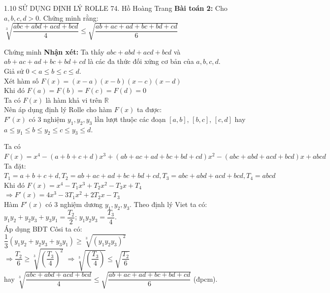 \begin{frame}{{1.10 SỬ DỤNG ĐỊNH LÝ ROLLE \hspace{4cm}  74. Hồ Hoàng Trang}}
	\textbf{Bài toán 2:}
	Cho $a,b,c,d>0$. Chứng minh rằng: \\$\sqrt[3]{\dfrac{abc+abd+acd+bcd}{4}}\le \sqrt{\dfrac{ab+ac+ad+bc+bd+cd}{6}}$\\
	\pause
	\begin{block}{Chứng minh}
    \textbf{Nhận xét:} Ta thấy $abc+abd+acd+bcd$ và $ab+ac+ad+bc+bd+cd$ là các đa thức đối xứng cơ bản của $a,b,c,d$.\\
    \pause
        Giả sử $0< a\le b \le c  \le d$.\\
		Xét hàm số $F(x)=(x-a)(x-b)(x-c)(x-d)$\\
  \pause
		Khi đó $F(a)=F(b)=F(c)=F(d)=0$\\
  \pause
		Ta có $F(x)$ là hàm khả vi trên $\mathbb{R}$\\
  \pause
  Nên áp dụng định lý Rolle cho hàm $F(x)$ ta được:\\ $F'(x)$ có 3 nghiệm $y_1,y_2,y_3$ lần lượt thuộc các đoạn $\left[a,b\right]$, $\left[b,c\right]$, $\left[c,d\right]$ hay $a\le y_1 \le b \le y_2 \le c \le y_3 \le d$.\\
  \pause
   
	\end{block}
\end{frame} 
\begin{frame}
\begin{block}{}
Ta có $F(x)= x^4-(a+b+c+d)x^3+(ab+ac+ad+bc+bd+cd)x^2-(abc+abd+acd+bcd)x+abcd$\\
\pause
  Ta đặt:\\
   $T_1=a+b+c+d, T_2=ab+ac+ad+bc+bd+cd, T_3=abc+abd+acd+bcd, T_4=abcd$\\
Khi đó $F(x)=x^4-T_1x^3+T_2x^2-T_3x+T_4$\\
   \pause
    $\Longrightarrow F'(x)=4x^3-3T_1x^2+2T_2x-T_3$\\
    \pause
    Hàm $F'(x)$ có 3 nghiệm dương $y_1, y_2, y_3$. Theo định lý Viet ta có:\\
    $y_1y_2+y_2y_3+y_3y_1=\dfrac{T_2}{2}$; $y_1y_2y_3=\dfrac{T_3}{4}$.\\
    \pause
    Áp dụng BĐT Côsi ta có:\\
    $\dfrac{1}{3}(y_1y_2+y_2y_3+y_3y_1)\ge \sqrt[3]{(y_1y_2y_3)^2}$\\
    \pause
    $\Longrightarrow \dfrac{T_2}{6}\ge \sqrt[3]{\left(\dfrac{T_3}{4}\right)^2} $
     $\Longrightarrow  \sqrt[3]{\left(\dfrac{T_3}{4}\right)} \le \sqrt{\dfrac{T_2}{6}} $\\
     hay $\sqrt[3]{\dfrac{abc+abd+acd+bcd}{4}}\le \sqrt{\dfrac{ab+ac+ad+bc+bd+cd}{6}}$ (đpcm).
\end{block}
\end{frame}

